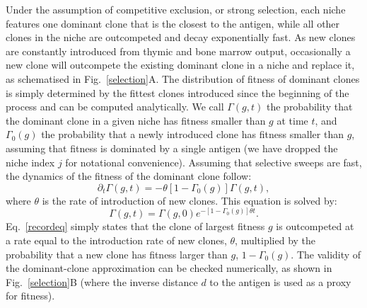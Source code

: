\documentclass[aps,pre,twocolumn,superscriptaddress,groupedaddress]{revtex4}
\newcommand{\beq}{\begin{equation}}
\newcommand{\eeq}{\end{equation}}
\newcommand{\<}{\langle}
\renewcommand{\>}{\rangle}
\begin{document}
Under the assumption of competitive exclusion, or strong selection, each niche features one dominant clone that is the closest to the antigen, while all other clones in the niche are outcompeted and decay exponentially fast. As new clones are constantly introduced from thymic and bone marrow output, occasionally a new clone will outcompete the existing dominant clone in a niche and replace it, as schematised in Fig.~\ref{selection}A. The distribution of fitness of dominant clones is simply determined by the fittest clones introduced since the beginning of the process and can be computed analytically.  We call $\Gamma(g,t)$ the probability that the dominant clone in a given niche has fitness smaller than $g$ at time $t$, and $\Gamma_0(g)$ the probability that a newly introduced clone has fitness smaller than $g$, assuming that fitness is dominated by a single antigen (we have dropped the niche index $j$ for notational convenience). Assuming that selective sweeps are fast, the dynamics of the fitness of the dominant clone follow:
\beq
\partial_t \Gamma(g,t)=-\theta[1-\Gamma_0(g)] \Gamma(g,t),
\label{recordeq}
\eeq
where $\theta$ is the rate of introduction of new clones. This equation is solved by:
\beq
\Gamma(g,t) = \Gamma(g,0) e^{-[1-\Gamma_0(g)] \theta t}.\label{record}
\eeq
Eq.~\ref{recordeq} simply states that the clone of largest fitness $g$ is outcompeted at a rate equal to the introduction rate of new clones, $\theta$, multiplied by the probability that a new clone has fitness larger than $g$, $1-\Gamma_0(g)$.
The validity of the dominant-clone approximation can be checked numerically, as shown in Fig.~\ref{selection}B (where the inverse distance $d$ to the antigen is used as a proxy for fitness).
\end{document}
